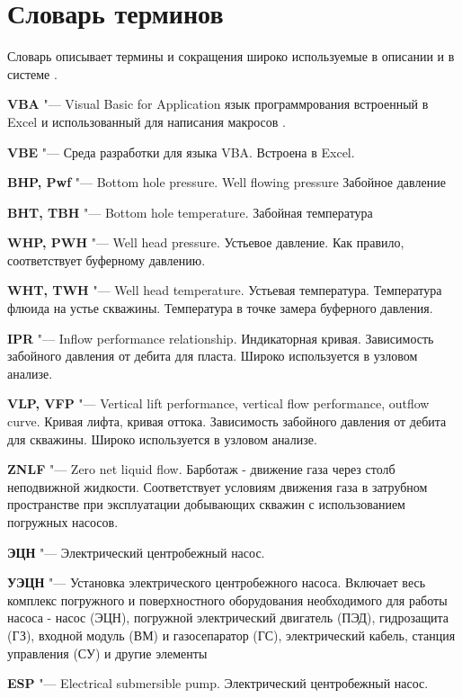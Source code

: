 \chapter*{Словарь терминов}             %

Словарь описывает термины и сокращения широко используемые в описании и в системе \unf.


\textbf{VBA} "--- Visual Basic for Application язык программрования встроенный в Excel и использованный для написания макросов \unf.

\textbf{VBE} "--- Среда разработки для языка VBA. Встроена в Excel.

\textbf{BHP, Pwf} "--- Bottom hole pressure. Well flowing pressure Забойное давление

\textbf{BHT, TBH} "--- Bottom hole temperature. Забойная температура

\textbf{WHP, PWH} "--- Well head pressure. Устьевое давление. Как правило, соответствует буферному давлению.

\textbf{WHT, TWH} "--- Well head temperature. Устьевая температура. Температура флюида на устье скважины. Температура в точке замера буферного давления.

\textbf{IPR} "--- Inflow performance relationship. Индикаторная кривая. Зависимость забойного давления от дебита для пласта. Широко используется в узловом анализе.

\textbf{VLP, VFP} "--- Vertical lift performance, vertical flow performance, outflow curve. Кривая лифта, кривая оттока. Зависимость забойного давления от дебита для скважины. Широко используется в узловом анализе.

\textbf{ZNLF} "--- Zero net liquid flow. Барботаж - движение газа через столб неподвижной жидкости. Соответствует условиям движения газа в затрубном пространстве при эксплуатации добывающих скважин с использованием погружных насосов.

\textbf{ЭЦН} "--- Электрический центробежный насос.

\textbf{УЭЦН} "--- Установка электрического центробежного насоса. Включает весь комплекс погружного и поверхностного оборудования необходимого для работы насоса - насос (ЭЦН), погружной электрический двигатель (ПЭД), гидрозащита (ГЗ), входной модуль (ВМ) и газосепаратор (ГС), электрический кабель, станция управления (СУ) и другие элементы

\textbf{ESP} "--- Electrical submersible pump. Электрический центробежный насос.

